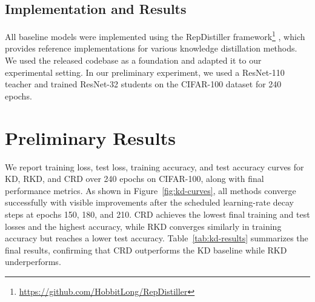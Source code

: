 \documentclass{article}
\begin{document}
\subsection{Implementation and Results}
All baseline models were implemented using the RepDistiller framework\footnote{\url{https://github.com/HobbitLong/RepDistiller}}
, which provides reference implementations for various knowledge distillation methods. We used the released codebase as a foundation and adapted it to our experimental setting. In our preliminary experiment, we used a ResNet-110 teacher and trained ResNet-32 students on the CIFAR-100 dataset for 240 epochs. 





\section{Preliminary Results}

We report training loss, test loss, training accuracy, and test accuracy curves for KD, RKD, and CRD over 240 epochs on CIFAR-100, along with final performance metrics. As shown in Figure~\ref{fig:kd-curves}, all methods converge successfully with visible improvements after the scheduled learning-rate decay steps at epochs 150, 180, and 210. CRD achieves the lowest final training and test losses and the highest accuracy, while RKD converges similarly in training accuracy but reaches a lower test accuracy. Table~\ref{tab:kd-results} summarizes the final results, confirming that CRD outperforms the KD baseline while RKD underperforms.

\end{document}
